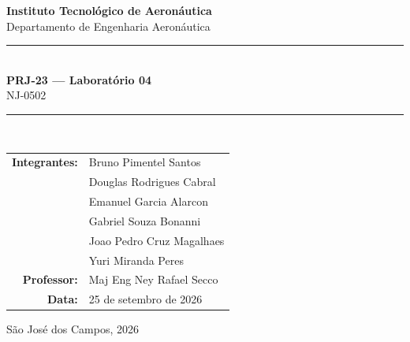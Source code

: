 \documentclass[11pt,a4paper]{article}
\begin{document}
\begin{titlepage}
  \centering
  \vspace*{1cm}

  {\Large \textbf{Instituto Tecnológico de Aeronáutica}} \\[0.4cm]
  {\large Departamento de Engenharia Aeronáutica} \\[1.5cm]

  \rule{\linewidth}{1pt} \\[0.4cm]
  {\LARGE \textbf{PRJ-23 --- Laboratório 04}} \\[0.3cm]
  {\Large NJ-0502} \\[0.3cm]
  \rule{\linewidth}{1pt} \\[2cm]

  \begin{tabular}{rl}
    \textbf{Integrantes:}  & Bruno Pimentel Santos \\
                           & Douglas Rodrigues Cabral \\
                           & Emanuel Garcia Alarcon \\
                           & Gabriel Souza Bonanni \\
                           & Joao Pedro Cruz Magalhaes \\
                           & Yuri Miranda Peres \\[0.6cm]
    \textbf{Professor:}    & Maj Eng Ney Rafael Secco \\[0.6cm]
    \textbf{Data:}         & 25 de setembro de 2026 \\
  \end{tabular}

  \vfill
  {\small São José dos Campos, 2026}
\end{titlepage}

\newpage





\end{document}

